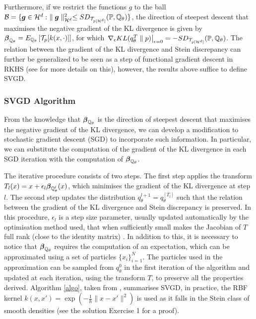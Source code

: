 Furthermore, if we restrict the functions $g$ to the ball $\mathcal{B} = \{\boldsymbol{g} \in \mathcal{H}^d:\ \parallel \boldsymbol{g}\parallel^2_{\mathcal{H}^d} \leq SD_{\mathcal{T}_{p[\mathcal{H}^d]}}(\mathbb{P}, \mathbb{Q}_{\theta})\}$, the direction of steepest descent that maximises the negative gradient of the KL divergence is given by $\boldsymbol{\beta}_{\mathbb{Q}_{\theta}} = E_{\mathbb{Q}_{\theta}}\left[\mathcal{T}_p[k(x, \cdot)]\right]$, for which $\left.\nabla_{\epsilon}KL(q_{\theta}^{T} \parallel p)\right\vert_{\epsilon = 0} = - SD_{\mathcal{T}_{p[\mathcal{H}^d]}}(\mathbb{P}, \mathbb{Q}_{\theta})$. The relation between the gradient of the KL divergence and Stein discrepancy can further be generalized to be seen as a step of functional gradient descent in RKHS (see \cite{liu2016stein} for more details on this), however, the results above suffice to define SVGD. 

\subsubsection{SVGD Algorithm} From the knowledge that $\boldsymbol{\beta}_{\mathbb{Q}_{\theta}}$ is the direction of steepest descent that maximises the negative gradient of the KL divergence, we can develop a modification to stochastic gradient descent (SGD) to incorporate such information. In particular, we can substitute the computation of the gradient of the KL divergence in each SGD iteration with the computation of $\boldsymbol{\beta}_{\mathbb{Q}_{\theta}}$. 

The iterative procedure consists of two steps. The first step applies the transform $T_l(x) = x + \epsilon_l \boldsymbol{\beta}_{\mathbb{Q}_{\theta}^l}(x)$, which minimises the gradient of the KL divergence at step $l$. The second step updates the distribution $q_{\theta}^{l+1} = q_{\theta}^{[T_{l}]}$ such that the relation between the gradient of the KL divergence and Stein discrepancy is preserved. In this procedure, $\epsilon_l$ is a step size parameter, usually updated automatically by the optimisation method used, that when sufficiently small makes the Jacobian of $T$ full rank (close to the identity matrix) \cite{liu2016stein}. In addition to this, it is necessary to notice that $\boldsymbol{\beta}_{\mathbb{Q}_{\theta}}$ requires the computation of an expectation, which can be approximated using a set of particles $\{x_i\}_{i=1}^N$. The particles used in the approximation can be sampled from $q_{\theta}^0$ in the first iteration of the algorithm and updated at each iteration, using the transform $T$, to preserve all the properties derived. Algorithm \ref{algo}, taken from \cite{liu2016stein}, summarises SVGD, in practice, the RBF kernel $k(x, x') = \exp\left(-\frac{1}{h}\parallel x - x'\parallel^2 \right)$ is used as it falls in the Stein class of smooth densities (see the solution Exercise 1 for a proof).

